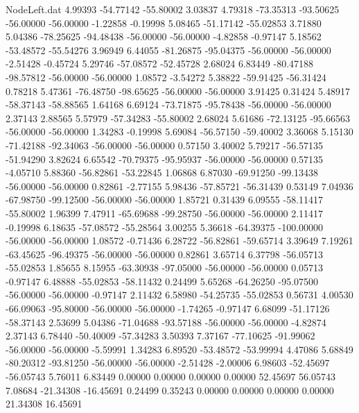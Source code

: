 \begin{filecontents}{NodeLeft.dat}
   4.99393  -54.77142  -55.80002     3.03837    4.79318  -73.35313  -93.50625  -56.00000  -56.00000   -1.22858   -0.19998
   5.08465  -51.17142  -55.02853     3.71880    5.04386  -78.25625  -94.48438  -56.00000  -56.00000   -4.82858   -0.97147
   5.18562  -53.48572  -55.54276     3.96949    6.44055  -81.26875  -95.04375  -56.00000  -56.00000   -2.51428   -0.45724
   5.29746  -57.08572  -52.45728     2.68024    6.83449  -80.47188  -98.57812  -56.00000  -56.00000    1.08572   -3.54272
   5.38822  -59.91425  -56.31424     0.78218    5.47361  -76.48750  -98.65625  -56.00000  -56.00000    3.91425    0.31424
   5.48917  -58.37143  -58.88565     1.64168    6.69124  -73.71875  -95.78438  -56.00000  -56.00000    2.37143    2.88565
   5.57979  -57.34283  -55.80002     2.68024    5.61686  -72.13125  -95.66563  -56.00000  -56.00000    1.34283   -0.19998
   5.69084  -56.57150  -59.40002     3.36068    5.15130  -71.42188  -92.34063  -56.00000  -56.00000    0.57150    3.40002
   5.79217  -56.57135  -51.94290     3.82624    6.65542  -70.79375  -95.95937  -56.00000  -56.00000    0.57135   -4.05710
   5.88360  -56.82861  -53.22845     1.06868    6.87030  -69.91250  -99.13438  -56.00000  -56.00000    0.82861   -2.77155
   5.98436  -57.85721  -56.31439     0.53149    7.04936  -67.98750  -99.12500  -56.00000  -56.00000    1.85721    0.31439
   6.09555  -58.11417  -55.80002     1.96399    7.47911  -65.69688  -99.28750  -56.00000  -56.00000    2.11417   -0.19998
   6.18635  -57.08572  -55.28564     3.00255    5.36618  -64.39375 -100.00000  -56.00000  -56.00000    1.08572   -0.71436
   6.28722  -56.82861  -59.65714     3.39649    7.19261  -63.45625  -96.49375  -56.00000  -56.00000    0.82861    3.65714
   6.37798  -56.05713  -55.02853     1.85655    8.15955  -63.30938  -97.05000  -56.00000  -56.00000    0.05713   -0.97147
   6.48888  -55.02853  -58.11432     0.24499    5.65268  -64.26250  -95.07500  -56.00000  -56.00000   -0.97147    2.11432
   6.58980  -54.25735  -55.02853     0.56731    4.00530  -66.09063  -95.80000  -56.00000  -56.00000   -1.74265   -0.97147
   6.68099  -51.17126  -58.37143     2.53699    5.04386  -71.04688  -93.57188  -56.00000  -56.00000   -4.82874    2.37143
   6.78440  -50.40009  -57.34283     3.50393    7.37167  -77.10625  -91.99062  -56.00000  -56.00000   -5.59991    1.34283
   6.89520  -53.48572  -53.99994     4.47086    5.68849  -80.20312  -93.81250  -56.00000  -56.00000   -2.51428   -2.00006
   6.98603  -52.45697  -56.05743     5.76011    6.83449    0.00000    0.00000    0.00000    0.00000   52.45697   56.05743
   7.08684  -21.34308  -16.45691     0.24499    0.35243    0.00000    0.00000    0.00000    0.00000   21.34308   16.45691

\end{filecontents}
